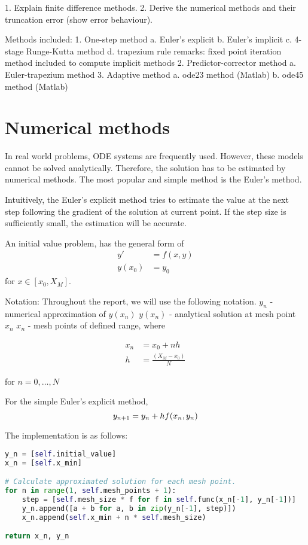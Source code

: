 1. Explain finite difference methods.
2. Derive the numerical methods and their truncation error (show error behaviour).

Methods included:
1. One-step method
    a. Euler's explicit
    b. Euler's implicit
    c. 4-stage Runge-Kutta method
    d. trapezium rule
    remarks: fixed point iteration method included to compute implicit methods
2. Predictor-corrector method
    a. Euler-trapezium method
3. Adaptive method
    a. ode23 method (Matlab)
    b. ode45 method (Matlab)
    
\chapter{Numerical methods}
\label{chap:numerical-methods}
In real world problems, ODE systems are frequently used. However, these models cannot be solved analytically. Therefore, the solution has to be estimated by numerical methods. The most popular and simple method is the Euler's method.

Intuitively, the Euler's explicit method tries to estimate the value at the next step following the gradient of the solution at current point. If the step size is sufficiently small, the estimation will be accurate.

An initial value problem, has the general form of 
\begin{align}
    y'&=f(x,y)\\
    y(x_0) &= y_0
\end{align}
for $x \in [x_0, X_M]$.

Notation:
Throughout the report, we will use the following notation.
$y_n$ - numerical approximation of $y(x_n)$
$y(x_n)$ - analytical solution at mesh point $x_n$
$x_n$ - mesh points of defined range, where

\begin{align}
    x_n &= x_0 + nh\\
    h &= \frac{(X_M - x_0)}{N}
\end{align}

for $n = 0,\dots, N$

For the simple Euler's explicit method, 
\begin{equation}
    y_{n+1} = y_n + hf(x_n,y_n)\\
\end{equation}

The implementation is as follows:

\begin{lstlisting}[language=Python]
y_n = [self.initial_value]
x_n = [self.x_min]

# Calculate approximated solution for each mesh point.
for n in range(1, self.mesh_points + 1):
    step = [self.mesh_size * f for f in self.func(x_n[-1], y_n[-1])]
    y_n.append([a + b for a, b in zip(y_n[-1], step)])
    x_n.append(self.x_min + n * self.mesh_size)

return x_n, y_n
\end{lstlisting}